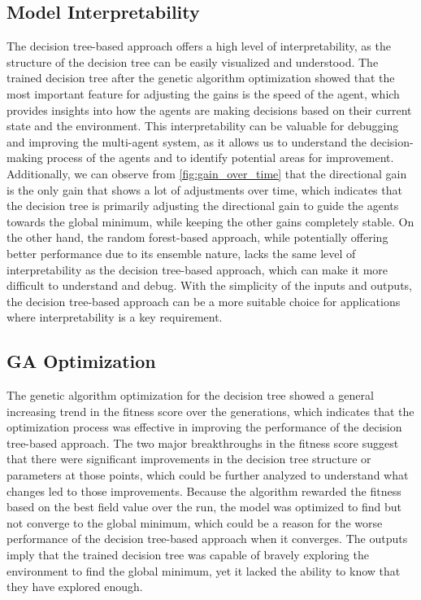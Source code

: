 \documentclass[11pt]{article}
\begin{document}
\subsection{Model Interpretability}
The decision tree-based approach offers a high level of interpretability, as the structure of the decision tree can be easily visualized and understood.
The trained decision tree after the genetic algorithm optimization showed that the most important feature for adjusting the gains is the speed of the agent, which provides insights into how the agents are making decisions based on their current state and the environment.
This interpretability can be valuable for debugging and improving the multi-agent system, as it allows us to understand the decision-making process of the agents and to identify potential areas for improvement.
Additionally, we can observe from \ref{fig:gain_over_time} that the directional gain is the only gain that shows a lot of adjustments over time, which indicates that the decision tree is primarily adjusting the directional gain to guide the agents towards the global minimum, while keeping the other gains completely stable.
On the other hand, the random forest-based approach, while potentially offering better performance due to its ensemble nature, lacks the same level of interpretability as the decision tree-based approach, which can make it more difficult to understand and debug.
With the simplicity of the inputs and outputs, the decision tree-based approach can be a more suitable choice for applications where interpretability is a key requirement.

\subsection{GA Optimization}
The genetic algorithm optimization for the decision tree showed a general increasing trend in the fitness score over the generations, which indicates that the optimization process was effective in improving the performance of the decision tree-based approach.
The two major breakthroughs in the fitness score suggest that there were significant improvements in the decision tree structure or parameters at those points, which could be further analyzed to understand what changes led to those improvements.
Because the algorithm rewarded the fitness based on the best field value over the run, the model was optimized to find but not converge to the global minimum, which could be a reason for the worse performance of the decision tree-based approach when it converges.
The outputs imply that the trained decision tree was capable of bravely exploring the environment to find the global minimum, yet it lacked the ability to know that they have explored enough.
\end{document}
